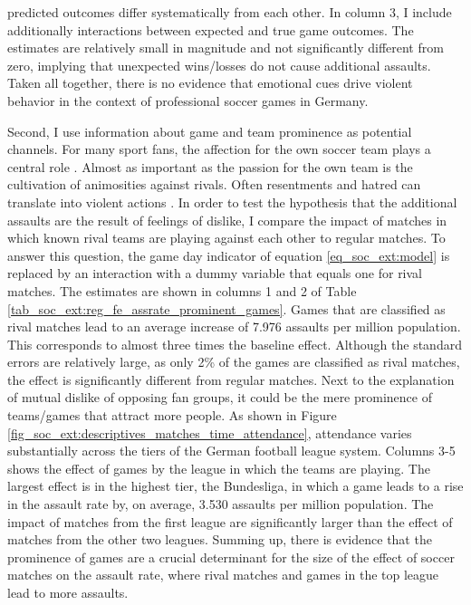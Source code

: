 \documentclass[11pt, a4paper]{article} %
\begin{document}
predicted outcomes differ systematically from each other. In column 3, I include additionally interactions between expected and true game outcomes. The estimates are relatively small in magnitude and not significantly different from zero, implying that unexpected wins/losses do not cause additional assaults. Taken all together, there is no evidence that emotional cues drive violent behavior in the context of professional soccer games in Germany.



Second, I use information about game and team prominence as potential channels. For many sport fans, the affection for the own soccer team plays a central role \citep{wann1993sports}. Almost as important as the passion for the own team is the cultivation of animosities against rivals. Often resentments and hatred can translate into violent actions \citep{nassauer2011hate}. In order to test the hypothesis that the additional assaults are the result of feelings of dislike, I compare the impact of matches in which known rival teams are playing against each other to regular matches. To answer this question, the game day indicator of equation \ref{eq_soc_ext:model} is replaced by an interaction with a dummy variable that equals one for rival matches. The estimates are shown in columns 1 and 2 of Table \ref{tab_soc_ext:reg_fe_assrate_prominent_games}. Games that are classified as rival matches lead to an average increase of 7.976 assaults per million population. This corresponds to almost three times the baseline effect. Although the standard errors are relatively large, as only 2\% of the games are classified as rival matches, the effect is significantly different from regular matches. Next to the explanation of mutual dislike of opposing fan groups, it could be the mere prominence of teams/games that attract more people. As shown in Figure \ref{fig_soc_ext:descriptives_matches_time_attendance}, attendance varies substantially across the tiers of the German football league system. Columns 3-5 shows the effect of games by the league in which the teams are playing. The largest effect is in the highest tier, the Bundesliga, in which a game leads to a rise in the assault rate by, on average, 3.530 assaults per million population. The impact of matches from the first league are significantly larger than the effect of matches from the other two leagues.  
Summing up, there is evidence that the prominence of games are a crucial determinant for the size of the effect of soccer matches on the assault rate, where rival matches and games in the top league lead to more assaults.
\end{document}
